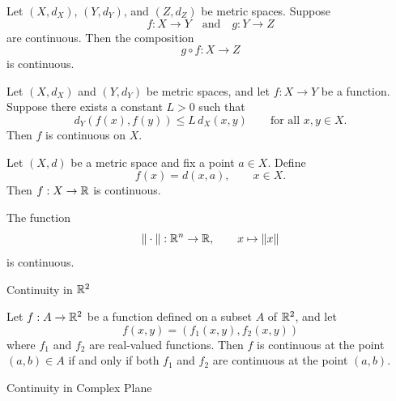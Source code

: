 \documentclass[12pt, a4paper]{article}
\begin{document}
\vspace{130pt}

\begin{theorem}
    Let $(X,d_X)$, $(Y,d_Y)$, and $(Z,d_Z)$ be metric spaces. Suppose
    \[
    f:X\to Y \quad \text{and} \quad g:Y\to Z
    \]
    are continuous. Then the composition
    \[
    g\circ f : X \to Z
    \]
    is continuous.
\end{theorem}

\clearpage

\begin{theorem}
    Let $(X,d_X)$ and $(Y,d_Y)$ be metric spaces, and let $f:X\to Y$ be a function. Suppose there exists a constant $L>0$ such that
    \[
    d_Y(f(x),f(y)) \leq L\, d_X(x,y)
    \qquad \text{for all } x,y\in X.
    \]
    Then $f$ is continuous on $X$.
\end{theorem}

\clearpage

\begin{theorem}
    Let $(X,d)$ be a metric space and fix a point $a\in X$. Define
    \[
    f(x)=d(x,a), \qquad x\in X.
    \]
    Then $f:X\to \mathbb{R}$ is continuous.
\end{theorem}

\clearpage

\begin{theorem}
    The function
    \[
    \|\cdot\| : \mathbb{R}^n \to \mathbb{R}, \qquad x\mapsto \|x\|
    \]
    is continuous.
\end{theorem}

\clearpage

\begin{heading}
    Continuity in $\R^2$
\end{heading}

\vspace{10pt}

\begin{theorem}[Continuity in $\R^2$]
    Let $f : A \to \mathbb{R}^2$ be a function defined on a subset $A$ of $\R^2$, and let $$f(x, y) = (f_1(x, y), f_2(x, y))$$ where $f_1$ and $f_2$ are real-valued functions. Then $f$ is continuous at the point $(a, b) \in A$ if and only if both $f_1$ and $f_2$ are continuous at the point $(a, b)$.
\end{theorem}

\clearpage

\begin{heading}
    Continuity in Complex Plane
\end{heading}
\end{document}
